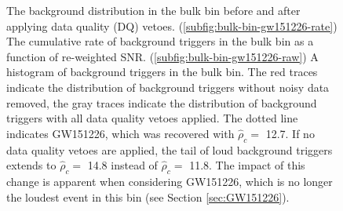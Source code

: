 \begin{figure}[!ht]%
\centering
  \caption[Bulk bin histograms - GW151226 analysis]{The background distribution in the bulk bin before and after applying data quality %
           (DQ) vetoes. %
           (\ref{subfig:bulk-bin-gw151226-rate}) The cumulative rate of background triggers %
           in the bulk bin as a function of re-weighted SNR. %
           (\ref{subfig:bulk-bin-gw151226-raw}) A histogram of background triggers %
           in the bulk bin. %
           The red traces indicate the %
           distribution of background triggers without noisy data removed, %
           the gray traces indicate the distribution %
           of background triggers with all data quality vetoes applied. %
           The dotted line indicates GW151226, which was recovered with $\hat{\rho}_{c} =$ 12.7. %
           If no data quality vetoes are applied, the tail of loud background triggers extends to %
           $\hat{\rho}_{c} =$ 14.8 instead of $\hat{\rho}_{c} =$ 11.8. %
           The impact of this change is apparent when considering GW151226, which is no %
           longer the loudest event in this bin (see Section \ref{sec:GW151226}). %
          }
\label{fig:bulk-bin-far-GW151226}
\end{figure}

